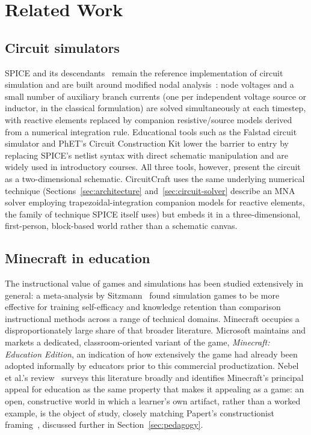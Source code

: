 \section{Related Work}
\label{sec:related-work}

\subsection{Circuit simulators}

SPICE and its descendants~\cite{nagel1973spice} remain the reference implementation of
circuit simulation and are built around modified nodal analysis~\cite{ho1975mna}: node
voltages and a small number of auxiliary branch currents (one per independent voltage source
or inductor, in the classical formulation) are solved simultaneously at each timestep, with
reactive elements replaced by companion resistive/source models derived from a numerical
integration rule. Educational tools such as the Falstad circuit simulator and PhET's Circuit
Construction Kit lower the barrier to entry by replacing SPICE's netlist syntax with direct
schematic manipulation and are widely used in introductory courses. All three tools,
however, present the circuit as a two-dimensional schematic. CircuitCraft uses the same
underlying numerical technique (Sections~\ref{sec:architecture}
and~\ref{sec:circuit-solver} describe an MNA solver employing trapezoidal-integration
companion models for reactive elements, the family of technique SPICE itself uses) but
embeds it in a three-dimensional, first-person, block-based world rather than a schematic
canvas.

\subsection{Minecraft in education}
\label{sec:minecraft-in-education}

The instructional value of games and simulations has been studied extensively in general: a
meta-analysis by Sitzmann~\cite{sitzmann2011meta} found simulation games to be more
effective for training self-efficacy and knowledge retention than comparison instructional
methods across a range of technical domains. Minecraft occupies a disproportionately large
share of that broader literature. Microsoft maintains and markets a dedicated,
classroom-oriented variant of the game, \emph{Minecraft: Education Edition}, an indication of
how extensively the game had already been adopted informally by educators prior to this
commercial productization. Nebel et al.'s review~\cite{nebel2016mining} surveys this
literature broadly and identifies Minecraft's principal appeal for education as the same
property that makes it appealing as a game: an open, constructive world in which a learner's
own artifact, rather than a worked example, is the object of study, closely matching
Papert's constructionist framing~\cite{papert1980mindstorms}, discussed further in
Section~\ref{sec:pedagogy}.

